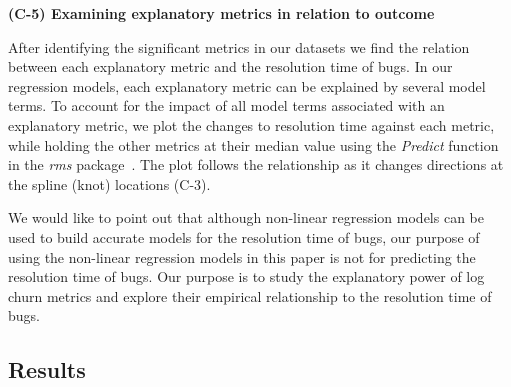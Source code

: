\noindent \textbf{(C-5) Examining explanatory metrics in relation to outcome}

After identifying the significant metrics in our datasets we find the relation between each explanatory metric and the resolution time of bugs. In our regression models, each explanatory metric can be explained by several model terms. To account for the impact of all model terms associated with an explanatory metric, we plot the changes to resolution time against each metric, while holding the other metrics at their median value using the \emph{Predict} function in the \emph{rms} package~\cite{rmsPackage}. The plot follows the relationship as it changes directions at the spline (knot) locations (C-3). 

We would like to point out that although non-linear regression models can be used to build accurate models for the resolution time of bugs, our purpose of using the non-linear regression models in this paper is not for predicting the resolution time of bugs. Our purpose is to study the explanatory power of log churn metrics and explore their empirical relationship to the resolution time of bugs.%



\subsection*{Results}

